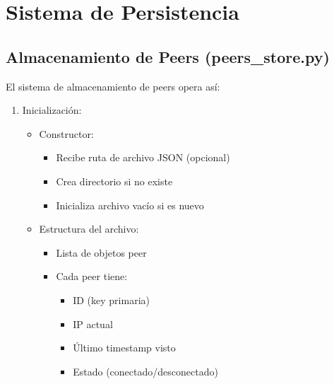 \documentclass[12pt]{article}
\begin{document}
\section{Sistema de Persistencia}
\subsection{Almacenamiento de Peers (peers\_store.py)}
El sistema de almacenamiento de peers opera así:

\begin{enumerate}
    \item Inicialización:
    \begin{itemize}
        \item Constructor:
        \begin{itemize}
            \item Recibe ruta de archivo JSON (opcional)
            \item Crea directorio si no existe
            \item Inicializa archivo vacío si es nuevo
        \end{itemize}
        \item Estructura del archivo:
        \begin{itemize}
            \item Lista de objetos peer
            \item Cada peer tiene:
            \begin{itemize}
                \item ID (key primaria)
                \item IP actual
                \item Último timestamp visto
                \item Estado (conectado/desconectado)
            \end{itemize}
        \end{itemize}
    \end{itemize}


\end{enumerate}
\end{document}
